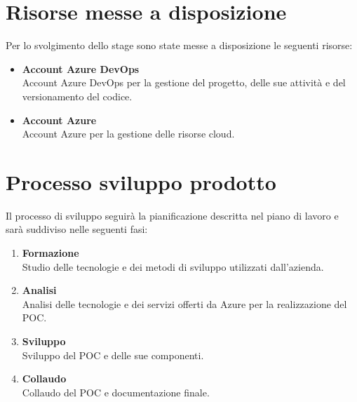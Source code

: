 \section{Risorse messe a disposizione}
\label{sec:risorse-messe-a-disposizione}
Per lo svolgimento dello stage sono state messe a disposizione le seguenti risorse:
\begin{itemize}
    \item \textbf{Account Azure DevOps} \\
    Account Azure DevOps per la gestione del progetto, delle sue attività e del versionamento del codice.
    \item \textbf{Account Azure} \\
    Account Azure per la gestione delle risorse cloud.
\end{itemize}

\section{Processo sviluppo prodotto}
Il processo di sviluppo seguirà la pianificazione descritta nel piano di lavoro e sarà suddiviso nelle seguenti fasi:
\begin{enumerate}
    \item \textbf{Formazione} \\
    Studio delle tecnologie e dei metodi di sviluppo utilizzati dall'azienda.
    \item \textbf{Analisi} \\
    Analisi delle tecnologie e dei servizi offerti da Azure per la realizzazione del POC.
    \item \textbf{Sviluppo} \\
    Sviluppo del POC e delle sue componenti.
    \item \textbf{Collaudo} \\
    Collaudo del POC e documentazione finale.
\end{enumerate}
